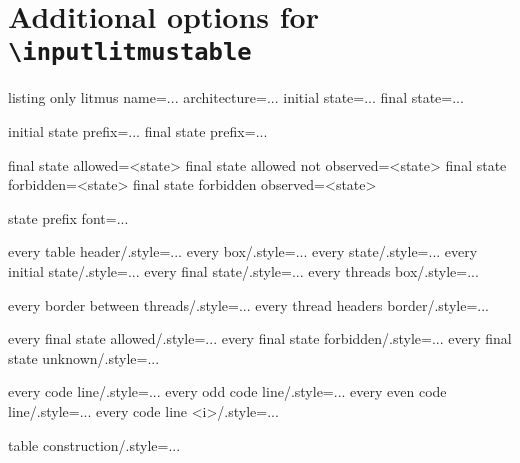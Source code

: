 \documentclass[a4paper]{article}
\begin{document}

\section{Additional options for \texttt{\textbackslash inputlitmustable}}

\begin{tcblisting}{listing only}
litmus name={...}   %
architecture={...}  %
initial state={...} %
final state={...}   %

initial state prefix={...}  %
final state prefix={...}    %

final state allowed={<state>}               %
final state allowed not observed={<state>}  %
final state forbidden={<state>}             %
final state forbidden observed={<state>}    %

state prefix font={...} %

every table header/.style={...}
every box/.style={...}
every state/.style={...}
every initial state/.style={...}
every final state/.style={...}
every threads box/.style={...}

every border between threads/.style={...}
every thread headers border/.style={...}

every final state allowed/.style={...}
every final state forbidden/.style={...}
every final state unknown/.style={...}

every code line/.style={...}
every odd code line/.style={...}
every even code line/.style={...}
every code line <i>/.style={...} %

table construction/.style={...}
\end{tcblisting}
\end{document}
